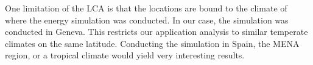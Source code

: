 One limitation of the LCA is that the locations are bound to the climate of where the energy simulation was conducted. In our case, the simulation was conducted in Geneva. This restricts our application analysis to similar temperate climates on the same latitude. Conducting the simulation in Spain, the MENA region, or a tropical climate would yield very interesting results. 






